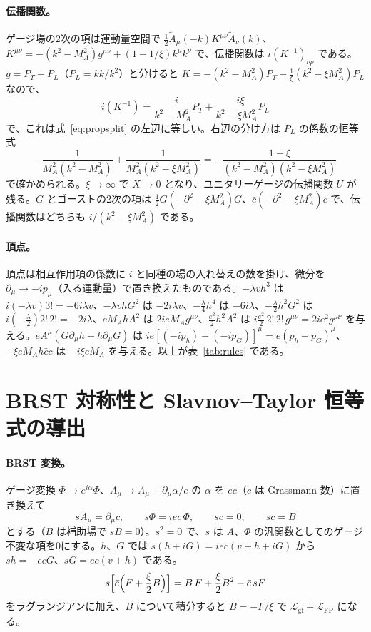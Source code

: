 \documentclass[a4paper,10pt]{ltjsarticle}
\begin{document}
\paragraph{伝播関数。}ゲージ場の2次の項は運動量空間で $\frac12\tilde A_\mu(-k)K^{\mu\nu}\tilde A_\nu(k)$、$K^{\mu\nu}=-(k^2-M_A^2)g^{\mu\nu}+(1-1/\xi)k^\mu k^\nu$ で、伝播関数は $i(K^{-1})_{\nu\rho}$ である。$g=P_T+P_L$（$P_L=kk/k^2$）と分けると $K=-(k^2-M_A^2)P_T-\frac1\xi(k^2-\xi M_A^2)P_L$ なので、
\begin{equation*}
i(K^{-1})=\frac{-i}{k^2-M_A^2}P_T+\frac{-i\xi}{k^2-\xi M_A^2}P_L
\end{equation*}
で、これは式~\eqref{eq:propsplit} の左辺に等しい。右辺の分け方は $P_L$ の係数の恒等式
\begin{equation*}
-\frac{1}{M_A^2(k^2-M_A^2)}+\frac{1}{M_A^2(k^2-\xi M_A^2)}=-\frac{1-\xi}{(k^2-M_A^2)(k^2-\xi M_A^2)}
\end{equation*}
で確かめられる。$\xi\to\infty$ で $X\to0$ となり、ユニタリーゲージの伝播関数 $U$ が残る。$G$ とゴーストの2次の項は $\frac12G(-\partial^2-\xi M_A^2)G$、$\bar c(-\partial^2-\xi M_A^2)c$ で、伝播関数はどちらも $i/(k^2-\xi M_A^2)$ である。

\paragraph{頂点。}頂点は相互作用項の係数に $i$ と同種の場の入れ替えの数を掛け、微分を $\partial_\mu\to-ip_\mu$（入る運動量）で置き換えたものである。$-\lambda vh^3$ は $i(-\lambda v)3!=-6i\lambda v$、$-\lambda vhG^2$ は $-2i\lambda v$、$-\frac\lambda4h^4$ は $-6i\lambda$、$-\frac\lambda2h^2G^2$ は $i(-\frac\lambda2)2!\,2!=-2i\lambda$、$eM_AhA^2$ は $2ieM_Ag^{\mu\nu}$、$\frac{e^2}2h^2A^2$ は $i\frac{e^2}2\,2!\,2!\,g^{\mu\nu}=2ie^2g^{\mu\nu}$ を与える。$eA^\mu(G\partial_\mu h-h\partial_\mu G)$ は $ie[(-ip_h)-(-ip_G)]^\mu=e(p_h-p_G)^\mu$、$-\xi eM_Ah\bar cc$ は $-i\xi eM_A$ を与える。以上が表~\ref{tab:rules} である。

\section{BRST 対称性と Slavnov--Taylor 恒等式の導出}\label{app:brst}

\paragraph{BRST 変換。}ゲージ変換 $\Phi\to e^{i\alpha}\Phi$、$A_\mu\to A_\mu+\partial_\mu\alpha/e$ の $\alpha$ を $ec$（$c$ は Grassmann 数）に置き換えて
\begin{equation*}
sA_\mu=\partial_\mu c,\qquad s\Phi=iec\,\Phi,\qquad sc=0,\qquad s\bar c=B
\end{equation*}
とする（$B$ は補助場で $sB=0$）。$s^2=0$ で、$s$ は $A$、$\Phi$ の汎関数としてのゲージ不変な項を0にする。$h$、$G$ では $s(h+iG)=iec(v+h+iG)$ から $sh=-ecG$、$sG=ec(v+h)$ である。
\begin{equation*}
s\Bigl[\bar c\Bigl(F+\frac\xi2B\Bigr)\Bigr]=B\,F+\frac\xi2B^2-\bar c\,sF
\end{equation*}
をラグランジアンに加え、$B$ について積分すると $B=-F/\xi$ で $\mathcal L_{\mathrm{gf}}+\mathcal L_{\mathrm{FP}}$ になる。
\end{document}
